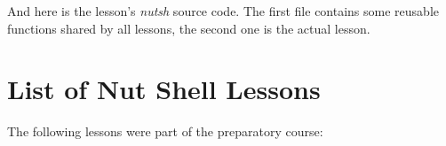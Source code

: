 \documentclass[paper=a4,twoside,abstract=on,cleardoublepage=empty,numbers=noenddot,toc=bib,toc=listof,12pt,appendixprefix=true]{scrreprt}
\begin{document}

%
And here is the lesson's \emph{nutsh} source code. The first file contains some reusable functions shared by all lessons, the second one is the actual lesson.



\label{lst:compress}


\chapter{List of Nut Shell Lessons}
\label{sec:lessons}

The following lessons were part of the preparatory course:
\end{document}
